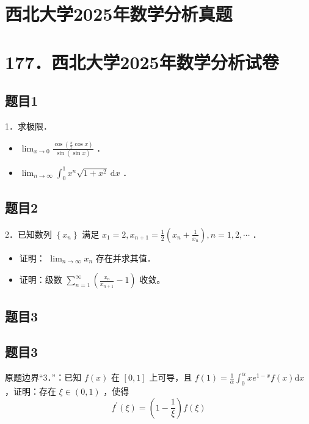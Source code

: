 \documentclass{article}
\begin{document}
\section*{西北大学2025年数学分析真题}
\section*{177．西北大学2025年数学分析试卷}

\subsection{题目1}
1．求极限．

\begin{itemize}
  \item[（1）] \(\lim _{x \rightarrow 0} \frac{\cos \left(\frac{\pi}{2} \cos x\right)}{\sin (\sin x)}\) ．
  \item[（2）] \(\lim _{n \rightarrow \infty} \int_{0}^{1} x^{n} \sqrt{1+x^{2}} \mathrm{~d} x\) ．
\end{itemize}

\subsection{题目2}
2．已知数列 \(\left\{x_{n}\right\}\) 满足 \(x_{1}=2, x_{n+1}=\frac{1}{2}\left(x_{n}+\frac{1}{x_{n}}\right), n=1,2, \cdots\) ．

\begin{itemize}
  \item[（1）] 证明： \(\lim _{n \rightarrow \infty} x_{n}\) 存在并求其值．
  \item[（2）] 证明：级数 \(\sum_{n=1}^{\infty}\left(\frac{x_{n}}{x_{n+1}}-1\right)\) 收敛。
\end{itemize}

\begin{itemize}

\subsection{题目3}
\end{itemize}

\subsection{题目3}
原题边界“3．”：已知 \(f(x)\) 在 \([0,1]\) 上可导，且 \(f(1)=\frac{1}{\alpha} \int_{0}^{\alpha} x e^{1-x} f(x) \mathrm{d} x\) ，证明：存在 \(\xi \in(0,1)\) ，使得
\[
f^{\prime}(\xi)=\left(1-\frac{1}{\xi}\right) f(\xi)
\]
\end{document}
